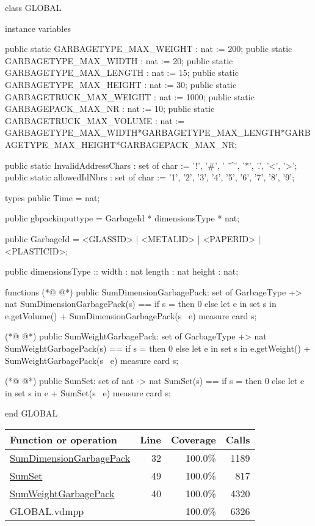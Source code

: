 \begin{vdmpp}[breaklines=true]
class GLOBAL

instance variables

public static GARBAGETYPE_MAX_WEIGHT    : nat := 200;
public static GARBAGETYPE_MAX_WIDTH     : nat := 20;
public static GARBAGETYPE_MAX_LENGTH    : nat := 15;
public static GARBAGETYPE_MAX_HEIGHT    : nat := 30;
public static GARBAGETRUCK_MAX_WEIGHT   : nat := 1000;
public static GARBAGEPACK_MAX_NR        : nat := 10;
public static GARBAGETRUCK_MAX_VOLUME   : nat := GARBAGETYPE_MAX_WIDTH*GARBAGETYPE_MAX_LENGTH*GARBAGETYPE_MAX_HEIGHT*GARBAGEPACK_MAX_NR;


public static InvalidAddressChars : set of char := {'!', '#', '%
                                            '^', '*', '.', '<', '>'};
public static allowedIdNbrs : set of char := {'1', '2', '3', '4', '5', '6', '7', '8', '9'};


types 
    public Time = nat;

    public gbpackinputtype = GarbageId * dimensionsType * nat;

    public GarbageId = <GLASSID> | <METALID> | <PAPERID> | <PLASTICID>;

    public dimensionsType :: width  : nat
                            length : nat
                            height : nat;

    
functions
(*@
\label{SumDimensionGarbagePack:32}
@*)
public SumDimensionGarbagePack: set of GarbageType +> nat
SumDimensionGarbagePack(s) ==
    if s = {}                         
    then 0                                         
    else let e in set s in
        e.getVolume() + SumDimensionGarbagePack(s \ {e})
measure card s;

(*@
\label{SumWeightGarbagePack:40}
@*)
public SumWeightGarbagePack: set of GarbageType +> nat
SumWeightGarbagePack(s) ==
    if s = {}                         
    then 0                                         
    else let e in set s in
        e.getWeight() + SumWeightGarbagePack(s \ {e})
measure card s;


(*@
\label{SumSet:49}
@*)
public SumSet: set of nat -> nat
SumSet(s) ==
    if s = {}
    then 0
    else let e in set s in
        e + SumSet(s \ {e})
measure card s;


end GLOBAL
\end{vdmpp}
\bigskip
\begin{longtable}{|l|r|r|r|}
\hline
Function or operation & Line & Coverage & Calls \\
\hline
\hline
\hyperref[SumDimensionGarbagePack:32]{SumDimensionGarbagePack} & 32&100.0\% & 1189 \\
\hline
\hyperref[SumSet:49]{SumSet} & 49&100.0\% & 817 \\
\hline
\hyperref[SumWeightGarbagePack:40]{SumWeightGarbagePack} & 40&100.0\% & 4320 \\
\hline
\hline
GLOBAL.vdmpp & & 100.0\% & 6326 \\
\hline
\end{longtable}

